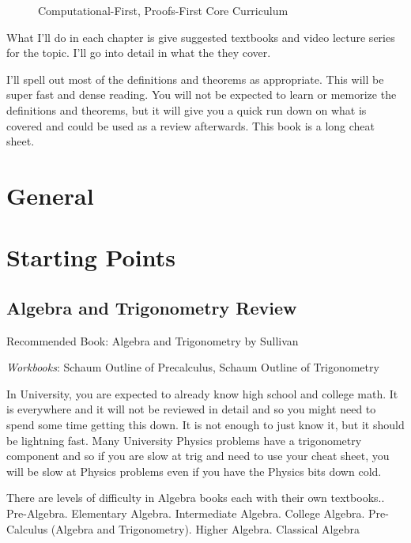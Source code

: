 \documentclass[openany,10pt]{book}
\begin{document}
\begin{figure}[H]
\caption{Computational-First, Proofs-First Core Curriculum} \label{fig:M4}
\end{figure}

What I'll do in each chapter is give suggested textbooks and video lecture series for the topic.  I'll go into detail in what the they cover.  

I'll spell out most of the definitions and theorems as appropriate.  This will be super fast and dense reading.  You will not be expected to learn or memorize the definitions and theorems, but it will give you a quick run down on what is covered and could be used as a review afterwards.  This book is a long cheat sheet.


\part{General}

\part{Starting Points}

\chapter{Algebra and Trigonometry Review}

Recommended Book: Algebra and Trigonometry by Sullivan\newline

\noindent \textit{Workbooks}: Schaum Outline of Precalculus, Schaum Outline of Trigonometry\newline

\noindent In University, you are expected to already know high school and college math.  It is everywhere and it will not be reviewed in detail and so you might need to spend some time getting this down.  It is not enough to just know it, but it should be lightning fast.  Many University Physics problems have a trigonometry component and so if you are slow at trig and need to use your cheat sheet, you will be slow at Physics problems even if you have the Physics bits down cold.

There are levels of difficulty in Algebra books each with their own textbooks.. Pre-Algebra. Elementary Algebra. Intermediate Algebra. College Algebra. Pre-Calculus (Algebra and Trigonometry). Higher Algebra. Classical Algebra\newline
\end{document}
